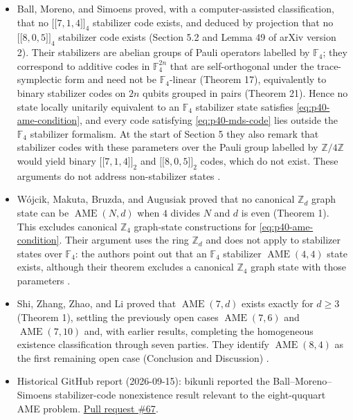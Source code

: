 \begin{itemize}
  \item Ball, Moreno, and Simoens proved, with a computer-assisted
  classification, that no $\bigl[\!\bigl[7,1,4\bigr]\!\bigr]_{4}$
  stabilizer code exists, and deduced by projection that no
  $\bigl[\!\bigl[8,0,5\bigr]\!\bigr]_{4}$ stabilizer code exists
  (Section 5.2 and Lemma 49 of arXiv version 2).  Their stabilizers are
  abelian groups of Pauli operators labelled by $\mathbb{F}_{4}$; they
  correspond to additive codes in $\mathbb{F}_{4}^{2n}$ that are
  self-orthogonal under the trace-symplectic form and need not be
  $\mathbb{F}_{4}$-linear (Theorem 17), equivalently to binary stabilizer
  codes on $2n$ qubits grouped in pairs (Theorem 21).  Hence no state
  locally unitarily equivalent to an $\mathbb{F}_{4}$ stabilizer state
  satisfies \eqref{eq:p40-ame-condition}, and every code satisfying
  \eqref{eq:p40-mds-code} lies outside the $\mathbb{F}_{4}$ stabilizer
  formalism.  At the start of Section 5 they
  also remark that stabilizer codes with these parameters over the Pauli
  group labelled by $\mathbb{Z}/4\mathbb{Z}$ would yield binary
  $\bigl[\!\bigl[7,1,4\bigr]\!\bigr]_{2}$ and
  $\bigl[\!\bigl[8,0,5\bigr]\!\bigr]_{2}$ codes, which do not exist.
  These arguments do not address non-stabilizer states
  .

  \item W\'ojcik, Makuta, Bruzda, and Augusiak proved that no canonical
  $\mathbb{Z}_{d}$ graph state can be $\operatorname{AME}(N,d)$ when $4$
  divides $N$ and $d$ is even (Theorem 1).  This excludes canonical
  $\mathbb{Z}_{4}$ graph-state constructions for
  \eqref{eq:p40-ame-condition}.  Their argument uses the ring
  $\mathbb{Z}_{d}$ and does not apply to stabilizer states over
  $\mathbb{F}_{4}$: the authors point out that an $\mathbb{F}_{4}$
  stabilizer $\operatorname{AME}(4,4)$ state exists, although their theorem
  excludes a canonical $\mathbb{Z}_{4}$ graph state with those parameters
  .

  \item Shi, Zhang, Zhao, and Li proved that
  $\operatorname{AME}(7,d)$ exists exactly for $d\geq 3$ (Theorem 1),
  settling the previously open cases $\operatorname{AME}(7,6)$ and
  $\operatorname{AME}(7,10)$ and, with earlier results, completing the
  homogeneous existence classification through seven parties.  They
  identify $\operatorname{AME}(8,4)$ as the first remaining open case
  (Conclusion and Discussion) .

  \item Historical GitHub report (2026-09-15): bikunli reported the Ball--Moreno--Simoens stabilizer-code nonexistence result relevant to the eight-ququart AME problem. \href{https://github.com/Naixu-Guo/quantum-open-problems/pull/67}{Pull request \#67}.
\end{itemize}

